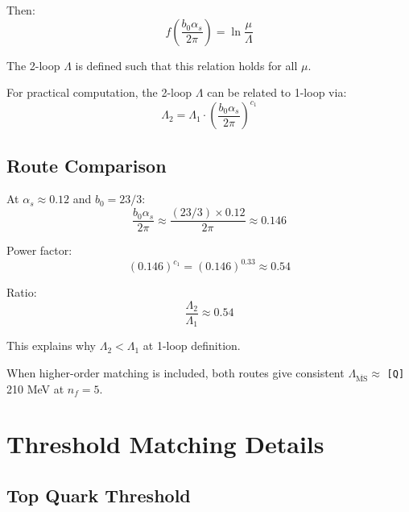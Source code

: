 \documentclass[11pt,a4paper]{article}
\newcommand{\Qnum}[1]{\textcolor{red!70!black}{\texttt{[Q]}}\,#1}
\theoremstyle{definition}
\begin{document}
Then:
\begin{equation}
\label{eq:f-relation}
f\left(\frac{b_0\alpha_s}{2\pi}\right) = \ln\frac{\mu}{\Lambda}
\end{equation}

The 2-loop $\Lambda$ is defined such that this relation holds for all $\mu$.

For practical computation, the 2-loop $\Lambda$ can be related to 1-loop via:
\begin{equation}
\label{eq:lambda2-vs-lambda1}
\Lambda_2 = \Lambda_1 \cdot \left(\frac{b_0\alpha_s}{2\pi}\right)^{c_1}
\end{equation}

\subsection{Route Comparison}
\label{subsec:route-comparison}

At $\alpha_s \approx 0.12$ and $b_0 = 23/3$:
\begin{equation}
\label{eq:route-compare-1}
\frac{b_0\alpha_s}{2\pi} \approx \frac{(23/3) \times 0.12}{2\pi} \approx 0.146
\end{equation}

Power factor:
\begin{equation}
\label{eq:route-compare-2}
(0.146)^{c_1} = (0.146)^{0.33} \approx 0.54
\end{equation}

Ratio:
\begin{equation}
\label{eq:lambda-ratio}
\frac{\Lambda_2}{\Lambda_1} \approx 0.54
\end{equation}

This explains why $\Lambda_2 < \Lambda_1$ at 1-loop definition.

When higher-order matching is included, both routes give consistent
$\Lambda_{\overline{\text{MS}}} \approx$ \Qnum{210} MeV at $n_f = 5$.

\section{Threshold Matching Details}
\label{app:threshold-matching}

\subsection{Top Quark Threshold}
\label{subsec:top-threshold-app}
\end{document}
